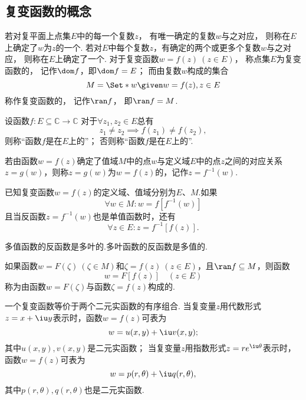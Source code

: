 \subsection{复变函数的概念}
\begin{definition}
若对复平面上点集\(E\)中的每一个复数\(z\)，
有唯一确定的复数\(w\)与之对应，
则称在\(E\)上确定了\(w\)为\(z\)的一个.
若对\(E\)中每个复数\(z\)，有确定的两个或更多个复数\(w\)与之对应，
则称在\(E\)上确定了一个.
对于复变函数\(w = f(z)\ (z \in E)\)，
称点集\(E\)为复变函数的，
记作\(\dom f\)，即\(\dom f = E\)；
而由复数\(w\)构成的集合\[
	M = \Set*{ w \given w = f(z), z \in E }
\]
称作复变函数的，
记作\(\ran f\)，
即\(\ran f = M\).
\end{definition}

\begin{definition}
设函数\(f\colon E\subseteq\mathbb{C}\to\mathbb{C}\)
对于\(\forall z_1,z_2 \in E\)总有\[
	z_1 \neq z_2
	\implies
	f(z_1) \neq f(z_2),
\]
则称“函数\(f\)是在\(E\)上的”；
否则称“函数\(f\)是在\(E\)上的”.
\end{definition}

\begin{definition}
若由函数\(w=f(z)\)确定了值域\(M\)中的点\(w\)与定义域\(E\)中的点\(z\)之间的对应关系\(z=g(w)\)，则称\(z=g(w)\)为\(w=f(z)\)的，记作\(z=f^{-1}(w)\).
\end{definition}

\begin{property}
已知复变函数\(w=f(z)\)的定义域、值域分别为\(E\)、\(M\).如果\[
\forall w \in M: w=f[f^{-1}(w)]
\]且当反函数\(z=f^{-1}(w)\)也是单值函数时，还有\[
\forall z \in E : z=f^{-1}[f(z)].
\]
\end{property}

\begin{property}
多值函数的反函数是多叶的.多叶函数的反函数是多值的.
\end{property}

\begin{definition}
如果函数\(w = F(\zeta)\ (\zeta \in M)\)和\(\zeta = f(z)\ (z \in E)\)，且\(\ran f \subseteq M\)，则函数\[
w = F[f(z)] \quad (z \in E)
\]称为由函数\(w = F(\zeta)\)与函数\(\zeta = f(z)\)构成的.
\end{definition}

一个复变函数等价于两个二元实函数的有序组合.
当复变量\(z\)用代数形式\(z = x + \iu y\)表示时，函数\(w = f(z)\)可表为\[
w = u(x,y) + \iu v(x,y);
\]其中\(u(x,y), v(x,y)\)是二元实函数；
当复变量\(z\)用指数形式\(z = r e^{\iu \theta}\)表示时，函数\(w = f(z)\)可表为\[
w = p(r,\theta) + \iu q(r,\theta),
\]其中\(p(r,\theta), q(r,\theta)\)也是二元实函数.

